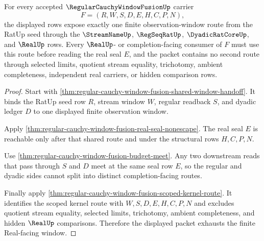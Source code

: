 \begin{theorem}
\label{thm:regular-cauchy-window-fusion-finite-window-exactness}
For every accepted $\RegularCauchyWindowFusionUp$ carrier
$$
F=(R,W,S,D,E,H,C,P,N),
$$
the displayed rows expose exactly one finite observation-window route from the RatUp seed through the $\StreamNameUp$, $\RegSeqRatUp$, $\DyadicRatCoreUp$, and $\RealUp$ rows. Every $\RealUp$- or completion-facing consumer of $F$ must use this route before reading the real seal $E$, and the packet contains no second route through selected limits, quotient stream equality, trichotomy, ambient completeness, independent real carriers, or hidden comparison rows.
\end{theorem}
\begin{proof}
Start with \autoref{thm:regular-cauchy-window-fusion-shared-window-handoff}. It binds the RatUp seed row $R$, stream window $W$, regular readback $S$, and dyadic ledger $D$ to one displayed finite observation window.

Apply \autoref{thm:regular-cauchy-window-fusion-real-seal-nonescape}. The real seal $E$ is reachable only after that shared route and under the structural rows $H,C,P,N$.

Use \autoref{thm:regular-cauchy-window-fusion-budget-meet}. Any two downstream reads that pass through $S$ and $D$ meet at the same seal row $E$, so the regular and dyadic sides cannot split into distinct completion-facing routes.

Finally apply \autoref{thm:regular-cauchy-window-fusion-scoped-kernel-route}. It identifies the scoped kernel route with $W,S,D,E,H,C,P,N$ and excludes quotient stream equality, selected limits, trichotomy, ambient completeness, and hidden $\RealUp$ comparisons. Therefore the displayed packet exhausts the finite Real-facing window.
\end{proof}

